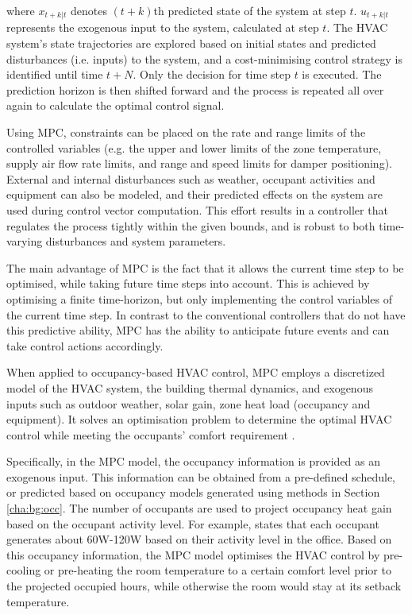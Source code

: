 \noindent where $x_{t+k|t}$ denotes $(t+k)$th predicted state of the system at step $t$. $u_{t+k|t}$ represents the exogenous input to the system, calculated at step $t$. The HVAC system's state trajectories are explored based on initial states and predicted disturbances (i.e. inputs) to the system, and a cost-minimising control strategy is identified until time $t+N$. 
Only the decision for time step $t$ is executed.
The prediction horizon is then shifted forward and the process is repeated all over again to calculate the optimal control signal.

Using MPC, constraints can be placed on the rate and range limits of the controlled variables (e.g. the upper and lower limits of the zone temperature, supply air flow rate limits, and range and speed limits for damper positioning). External and internal disturbances such as weather, occupant activities and equipment can also be modeled, and their predicted effects on the system are used during control vector computation. This effort results in a controller that regulates the process tightly within the given bounds, and is robust to both time-varying disturbances and system parameters. 

The main advantage of MPC is the fact that it allows the current time step to be optimised, while taking future time steps into account. This is achieved by optimising a finite time-horizon, but only implementing the control variables of the current time step. In contrast to the conventional controllers that do not have this predictive ability, MPC has the ability to anticipate future events and can take control actions accordingly. 

When applied to occupancy-based HVAC control, MPC employs a discretized model of the HVAC system, the building thermal dynamics, and exogenous inputs such as outdoor weather, solar gain, zone heat load (occupancy and equipment). It solves an optimisation problem to determine the optimal HVAC control while meeting the occupants' comfort requirement \citep{sun2010integrated,oldewurtel2010energy,nghiem2011receding,ma2011distributed,mady2011stochastic,oldewurtel2012use,goyal2012effect,oldewurtel2013importance,goyal2013occupancy,parisio2013randomized,zhang2013scenario,west2014trial,brooks2015energy}. 

Specifically, in the MPC model, the occupancy information is provided as an exogenous input. This information can be obtained from a pre-defined schedule, or predicted based on occupancy models generated using methods in Section \ref{cha:bg:occ}. The number of occupants are used to project occupancy heat gain based on the occupant activity level. For example, \cite{ashrae2013thermal} states that each occupant generates about 60W-120W based on their activity level in the office. Based on this occupancy information, the MPC model optimises the HVAC control by pre-cooling or pre-heating the room temperature to a certain comfort level prior to the projected occupied hours, while otherwise the room would stay at its setback temperature.


